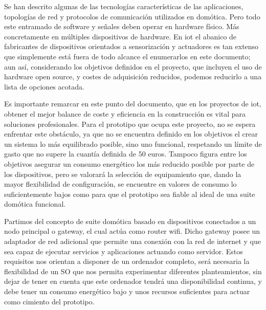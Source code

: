 Se han descrito algunas de las tecnologías características de las aplicaciones, topologías de red y protocolos de comunicación utilizados en domótica. Pero todo este entramado de software y señales deben operar en hardware físico. Más concretamente en múltiples dispositivos de hardware. En \gls{iot} el abanico de fabricantes de dispositivos orientados a sensorización y actuadores es tan extenso que simplemente está fuera de todo alcance el enumerarlos en este documento; aun así, considerando los objetivos definidos en el proyecto, que incluyen el uso de hardware open source, y costes de adquisición reducidos, podemos reducirlo a una lista de opciones acotada.

\vspace{1cm}

Es importante remarcar en este punto del documento, que en los proyectos de \gls{iot}, obtener el mejor balance de coste y eficiencia en la construcción es vital para soluciones profesionales. Para el prototipo que ocupa este proyecto, no se espera enfrentar este obstáculo, ya que no se encuentra definido en los objetivos el crear un sistema lo más equilibrado posible, sino uno funcional, respetando un límite de gasto que no supere la cuantía definida de 50 euros. Tampoco figura entre los objetivos asegurar un consumo energético los más reducido posible por parte de los dispositivos, pero se valorará la selección de equipamiento que, dando la mayor flexibilidad de configuración, se encuentre en valores de consumo lo suficientemente bajos como para que el prototipo sea fiable al ideal de una suite domótica funcional.

\vspace{1cm}

Partimos del concepto de suite domótica basado en dispositivos conectados a un nodo principal o \gls{gateway}, el cual actúa como router \gls{wifi}. Dicho \gls{gateway} posee un adaptador de red adicional que permite una conexión con la red de internet y que sea capaz de ejecutar servicios y aplicaciones actuando como servidor. Estos requisitos nos orientan a disponer de un ordenador completo, será necesaria la flexibilidad de un SO que nos permita experimentar diferentes planteamientos, sin dejar de tener en cuenta que este ordenador tendrá una disponibilidad continua, y debe tener un consumo energético bajo y unos recursos suficientes para actuar como cimiento del prototipo.

\vspace{1cm}

